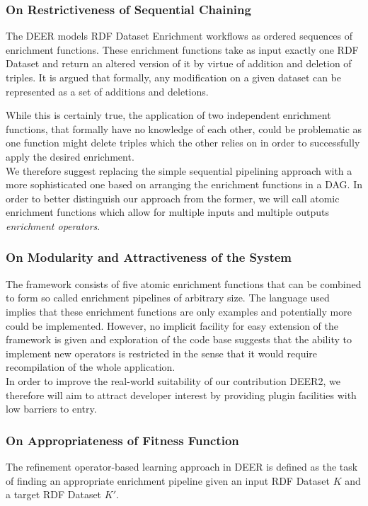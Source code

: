 \subsubsection*{On Restrictiveness of Sequential Chaining}
The \acl{DEER} models \ac{RDF} Dataset Enrichment workflows as ordered sequences of enrichment functions.
These enrichment functions take as input exactly one \ac{RDF} Dataset and return an altered version of it by virtue of addition and deletion of triples.
It is argued that formally, any modification on a given dataset can be represented as a set of additions and deletions.

While this is certainly true, the application of two independent enrichment functions, that formally have no knowledge of each other, could be problematic as one function might delete triples which the other relies on in order to successfully apply the desired enrichment.\\

We therefore suggest replacing the simple sequential pipelining approach with a more sophisticated one based on arranging the enrichment functions in a \ac{DAG}.
In order to better distinguish our approach from the former, we will call atomic enrichment functions which allow for multiple inputs and multiple outputs \emph{enrichment operators}.

\subsubsection*{On Modularity and Attractiveness of the System}
The framework consists of five atomic enrichment functions that can be combined to form so called enrichment pipelines of arbitrary size.
The language used implies that these enrichment functions are only examples and potentially more could be implemented.
However, no implicit facility for easy extension of the framework is given and exploration of the code base suggests that the ability to implement new operators is restricted in the sense that it would require recompilation of the whole application.\\

In order to improve the real-world suitability of our contribution \ac{DEER2}, we therefore will aim to attract developer interest by providing plugin facilities with low barriers to entry.

\subsubsection*{On Appropriateness of Fitness Function}
The refinement operator-based learning approach in \ac{DEER} is defined as the task of finding an appropriate enrichment pipeline given an input \ac{RDF} Dataset $K$ and a target \ac{RDF} Dataset $K'$.


